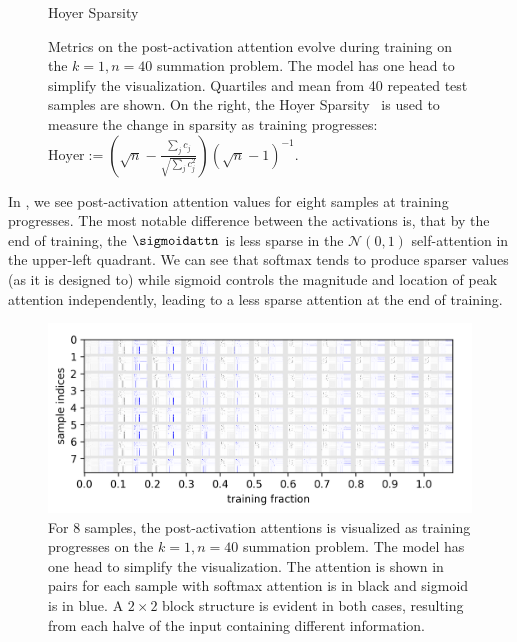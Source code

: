 \begin{figure}[h]
\begin{minipage}[b]{0.45\textwidth}
    \captionsetup{labelformat=empty}
    \caption{Hoyer Sparsity}
    \addtocounter{figure}{-1}
  \end{minipage}
  \caption{ Metrics on the post-activation attention evolve during training on the $k=1, n=40$ summation problem.  The model has one head to simplify the visualization. Quartiles and mean from 40 repeated test samples are shown. On the right, the Hoyer Sparsity~\citep{hurley2009comparing} is used to measure the change in sparsity as training progresses: $\text{Hoyer} := \left(\sqrt{n}-\frac{\sum_j c_j}{\sqrt{\sum_j c_j^2}}\right)(\sqrt{n}-1)^{-1}$.
  }
  \label{fig:attn_metric_evolve}
\end{figure}

In , we see post-activation attention values for eight samples at training progresses.  The most notable difference between the activations is, that by the end of training, the $\sigmoidattn$ is less sparse in the $\mathcal{N}(0,1)$ self-attention in the upper-left quadrant.  We can see that softmax tends to produce sparser values (as it is designed to) while sigmoid controls the magnitude and location of peak attention independently, leading to a less sparse attention at the end of training.

\begin{figure}[h]
    \centering
    \includegraphics[width=\textwidth]{figures/attn_progress_by_sample_large2.png}
    \caption{For 8 samples, the post-activation attentions is visualized as training progresses on the $k=1, n=40$ summation problem.  The model has one head to simplify the visualization.  The attention is shown in pairs for each sample with softmax attention is in black and sigmoid is in blue.  A $2 \times 2$ block structure is evident in both cases, resulting from each halve of the input containing different information.}
    \label{fig:attn_by_sample}
\end{figure}



